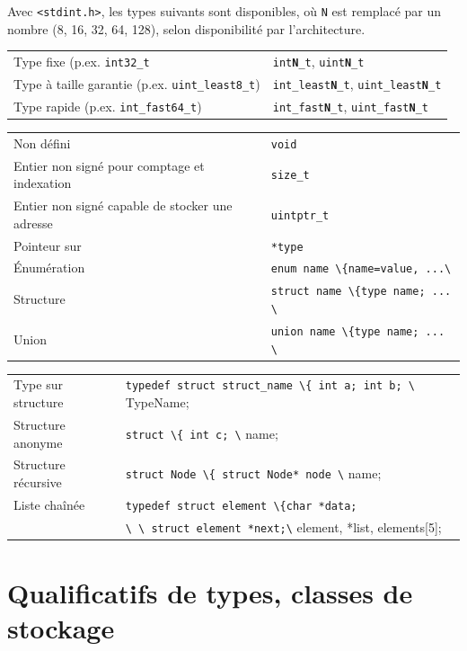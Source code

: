 \documentclass{article}
\newcommand{\cd}{\lstinline}
\begin{document}
\begin{multicols*}{3}
Avec \cd{<stdint.h>}, les types suivants sont disponibles, où \cd{N} est remplacé par un nombre (8, 16, 32, 64, 128), selon disponibilité par l'architecture.

\begin{tabularx}{\linewidth}{Xl}
  Type fixe (p.ex. \texttt{int32\_t} & \texttt{int\textbf{N}\_t}, \texttt{uint\textbf{N}\_t} \\
  Type à taille garantie (p.ex. \texttt{uint\_least8\_t}) & \texttt{int\_least\textbf{N}\_t}, \texttt{uint\_least\textbf{N}\_t} \\
  Type rapide (p.ex. \texttt{int\_fast64\_t}) & \texttt{int\_fast\textbf{N}\_t}, \texttt{uint\_fast\textbf{N}\_t} \\
\end{tabularx}

\begin{tabularx}{\linewidth}{Xl}
  Non défini                 & \cd{void} \\
  Entier non signé pour comptage et indexation & \cd{size_t} \\
  Entier non signé capable de stocker une adresse & \cd{uintptr_t} \\
  Pointeur sur                       & \cd{*type} \\
  Énumération                        & \cd{enum name \{name=value, ...\}}; \\
  Structure                          & \cd{struct name \{type name; ... \}}; \\
  Union                              & \cd{union name \{type name; ... \}}; \\
\end{tabularx}

\begin{tabularx}{\linewidth}{Xl}
  Type sur structure  & \cd{typedef struct struct_name \{ int a; int b; \} TypeName;} \\
  Structure anonyme   & \cd{struct \{ int c; \} name;} \\
  Structure récursive & \cd{struct Node \{ struct Node* node \} name;} \\
  Liste chaînée       & \cd{typedef struct element \{char *data;} \\
                      & \cd{\ \ struct element *next;\} element, *list, elements[5];}
\end{tabularx}

\section*{Qualificatifs de types, classes de stockage}


\end{multicols*}
\end{document}
